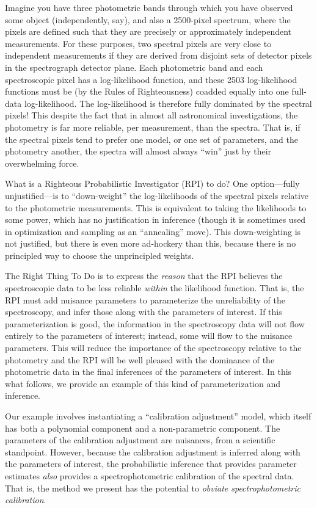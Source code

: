 \documentclass[12pt, letterpaper, preprint]{aastex}
\begin{document}
Imagine you have three photometric bands through which you have
observed some object (independently, say), and also a 2500-pixel
spectrum, where the pixels are defined such that they are precisely or
approximately independent measurements.
For these purposes, two spectral pixels are very close to independent
measurements if they are derived from disjoint sets of detector pixels
in the spectrograph detector plane.
Each photometric band and each spectroscopic pixel has a
log-likelihood function, and these 2503 log-likelihood functions must
be (by the Rules of Righteousness) coadded equally into one full-data
log-likelihood.
The log-likelihood is therefore fully dominated by the spectral
pixels!
This despite the fact that in almost all astronomical investigations,
the photometry is far more reliable, per measurement, than the
spectra.
That is, if the spectral pixels tend to prefer one model, or one set
of parameters, and the photometry another, the spectra will almost
always ``win'' just by their overwhelming force.

What is a Righteous Probabilistic Investigator (RPI) to do?
One option---fully unjustified---is to ``down-weight'' the
log-likelihoods of the spectral pixels relative to the photometric
measurements.
This is equivalent to taking the likelihoods to some power, which has
no justification in inference (though it is sometimes used in
optimization and sampling as an ``annealing'' move).
This down-weighting is not justified, but there is even more
ad-hockery than this, because there is no principled way to choose the
unprincipled weights.

The Right Thing To Do is to express the \emph{reason} that the RPI
believes the spectroscopic data to be less reliable \emph{within} the
likelihood function.
That is, the RPI must add nuisance parameters to parameterize the
unreliability of the spectroscopy, and infer those along with the
parameters of interest.
If this parameterization is good, the information in the spectroscopy
data will not flow entirely to the parameters of interest; instead,
some will flow to the nuisance parameters.
This will reduce the importance of the spectroscopy relative to the
photometry and the RPI will be well pleased with the dominance of the
photometric data in the final inferences of the parameters of
interest.
In this what follows, we provide an example of this kind of
parameterization and inference.

Our example involves instantiating a ``calibration adjustment'' model,
which itself has both a polynomial component and a non-parametric
component.
The parameters of the calibration adjustment are nuisances, from a
scientific standpoint.
However, because the calibration adjustment is inferred along with the
parameters of interest, the probabilistic inference that provides
parameter estimates \emph{also} provides a spectrophotometric
calibration of the spectral data.
That is, the method we present has the potential to \emph{obviate
spectrophotometric calibration}.
\end{document}
